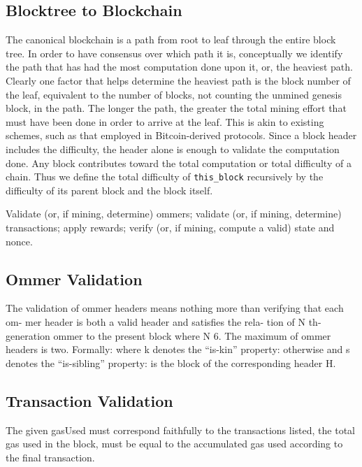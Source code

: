 \documentclass[10pt,a4paper,leqno,bibliography=totoc]{scrartcl}
\newenvironment{alphafootnotes}
{\par\edef\savedfootnotenumber{\number\value{footnote}}
\renewcommand{\thefootnote}{\alph{footnote}}
\setcounter{footnote}{0}}
{\par\setcounter{footnote}{\savedfootnotenumber}}
\begin{document}
\begin{alphafootnotes}
\begin{multicols*}{2}
		\subsection{Blocktree to Blockchain}
		
		The canonical blockchain is a path from root to leaf through the entire block tree. In order to have consensus over which path it is, conceptually we identify the path that has had the most computation done upon it, or, the heaviest path. Clearly one factor that helps determine the heaviest path is the block number of the leaf, equivalent to the number of blocks, not counting the unmined genesis block, in the path. The longer the path, the greater the total mining effort that must have been done in order to arrive at the leaf. This is akin to existing schemes, such as that employed in Bitcoin-derived protocols. Since a block header includes the difficulty, the header alone is enough to validate the computation done. Any block contributes toward the total computation or total difficulty of a chain. Thus we define the total difficulty of \texttt{this\_block} recursively by the difficulty of its parent block and the block itself.
		
		Validate (or, if mining, determine) ommers; validate (or, if mining, determine) transactions; apply rewards; verify (or, if mining, compute a valid) state and nonce. 
		
		\subsection{Ommer Validation} The validation of ommer headers means nothing more than verifying that each om- mer header is both a valid header and satisfies the rela- tion of N th-generation ommer to the present block where N  6. The maximum of ommer headers is two. Formally: where k denotes the “is-kin” property: otherwise and s denotes the “is-sibling” property: is the block of the corresponding header H. 
		
		\subsection{Transaction Validation} The given gasUsed must correspond faithfully to the transactions listed, the total gas used in the block, must be equal to the accumulated gas used according to the final transaction.
		

\end{multicols*}
\end{alphafootnotes}
\end{document}
